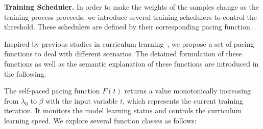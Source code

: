 \documentclass[sigconf]{acmart}
\begin{document}
\textbf{Training Scheduler.}
In order to make the weights of the samples change as the training process proceeds, we introduce several training schedulers to control the threshold. These schedulers are defined by their corresponding pacing function.

Inspired by previous studies in curriculum learning~\cite{wang2019dynamic,wang2021survey}, we propose a set of pacing functions to deal with different scenarios. The detained formulation of these functions as well as the semantic explanation of these functions are introduced in the following.

The self-paced pacing function $F(t)$ returns a value monotonically increasing from $\lambda_0$ to $\beta$ with the input variable $t$, which represents the current training iteration. It monitors the model learning status and controls the curriculum learning speed. We explore several function classes as follows:
\end{document}
